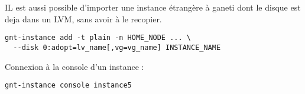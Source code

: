 IL est aussi possible d'importer une instance étrangère à ganeti dont le disque est deja dans un LVM, sans avoir à le recopier.

\begin{lstlisting}
gnt-instance add -t plain -n HOME_NODE ... \
  --disk 0:adopt=lv_name[,vg=vg_name] INSTANCE_NAME
\end{lstlisting}

Connexion à la console d'un instance :
\begin{lstlisting}
gnt-instance console instance5
\end{lstlisting}
